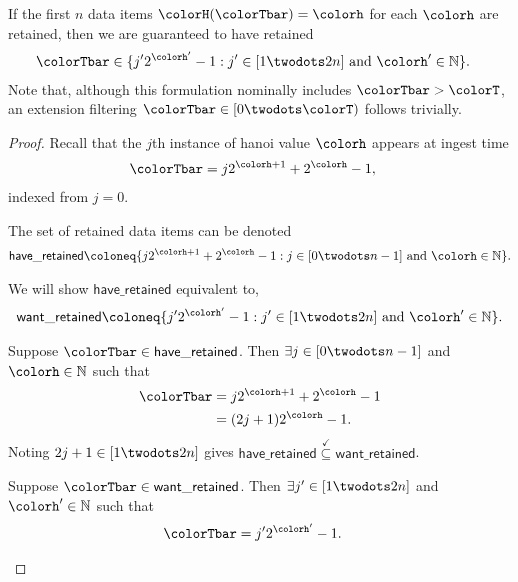 \begin{lemma}
\label{thm:retained-equivalence-stretched}
If the first $n$ data items $\colorH(\colorTbar) = \colorh$ for each \hv{} $\colorh$ are retained, then we are guaranteed to have retained
\begin{align*}
\colorTbar
&\in
\{
  j'2^{\colorh'} - 1
  :
  j' \in [1 \twodots 2n]
  \text{ and }
  \colorh' \in \mathbb{N}
\}.
\end{align*}
Note that, although this formulation nominally includes $\colorTbar > \colorT$, an extension filtering $\colorTbar \in [0 \twodots \colorT)$ follows trivially.
\end{lemma}
\begin{proof}

Recall that the $j$th instance of hanoi value $\colorh$ appears at ingest time
\begin{align*}
\colorTbar
&= j2^{\colorh + 1} + 2^{\colorh} - 1,
\end{align*}
indexed from $j=0$.

The set of retained data items can be denoted
\begin{align*}
\mathsf{have\_retained} \coloneq
\{
  j2^{\colorh + 1} + 2^{\colorh} - 1
  :
  j \in [0 \twodots n-1]
  \text{ and }
  \colorh \in \mathbb{N}
\}.
\end{align*}

We will show $\mathsf{have\_retained}$ equivalent to,
\begin{align*}
\mathsf{want\_retained} \coloneq
\{
  j'2^{\colorh'} - 1
  :
  j' \in [1 \twodots 2n]
  \text{ and }
  \colorh' \in \mathbb{N}
\}.
\end{align*}

\begin{proofpart}
Suppose $\colorTbar \in \mathsf{have\_retained}$.
Then $\exists j \in [0 \twodots n-1]$ and $\colorh \in \mathbb{N}$ such that
\begin{align*}
\colorTbar
&= j2^{\colorh + 1} + 2^{\colorh} - 1\\
&= (2j + 1)2^{\colorh} - 1.
\end{align*}
Noting $2j + 1 \in [1 \twodots 2n]$ gives $\mathsf{have\_retained} \stackrel{\checkmark}{\subseteq} \mathsf{want\_retained}$.
\end{proofpart}

\begin{proofpart}
Suppose $\colorTbar \in \mathsf{want\_retained}$.
Then $\exists j'\in [1 \twodots 2n]$ and $\colorh' \in \mathbb{N}$ such that
\begin{align*}
\colorTbar
&= j'2^{\colorh'} - 1.
\end{align*}


\end{proofpart}
\end{proof}
